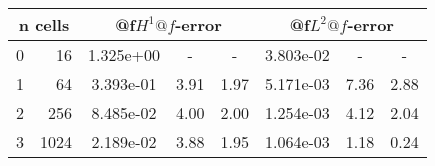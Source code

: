\documentclass[10pt]{report}
\begin{document}
\begin{table}[H]
\begin{center}
\begin{tabular}{|c|r|c|c|c|c|c|c|} \hline

\multicolumn{2}{|c|}{n cells} & 
\multicolumn{3}{|c|}{@f$H^1@f$-error} & 
\multicolumn{3}{|c|}{@f$L^2@f$-error}\\ \hline
0 & 16 & 1.325e+00 & - & - & 3.803e-02 & - & -\\ \hline
1 & 64 & 3.393e-01 & 3.91 & 1.97 & 5.171e-03 & 7.36 & 2.88\\ \hline
2 & 256 & 8.485e-02 & 4.00 & 2.00 & 1.254e-03 & 4.12 & 2.04\\ \hline
3 & 1024 & 2.189e-02 & 3.88 & 1.95 & 1.064e-03 & 1.18 & 0.24\\ \hline
\end{tabular}
\end{center}
\end{table}
\end{document}

